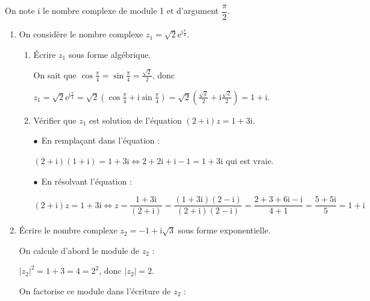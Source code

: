\documentclass{cornouaille}
\begin{document}

\Bareme

\begin{exercice}[][8]
On note i le nombre complexe de module 1 et d'argument $\dfrac{\pi}{2}$.
\medskip

\begin{enumerate}
\item On considère le nombre complexe $z_1 = \sqrt{2}\text{e}^{\text{i}\frac{\pi}{4}}$.
	\begin{enumerate}
		\item Écrire $z_1$ sous forme algébrique.
		
\ldotcarreaux[2]
\begin{solution}
On sait que $\cos \frac{\pi}{4} = \sin \frac{\pi}{4} = \frac{\sqrt{2}}{2}$, donc 
		
$z_1 = \sqrt{2}\text{e}^{\text{i}\frac{\pi}{4}} = \sqrt{2}\left(\cos \frac{\pi}{4} + \text{i} \sin \frac{\pi}{4}\right) = \sqrt{2}\left(\frac{\sqrt{2}}{2} + \text{i}\frac{\sqrt{2}}{2} \right) = 1 + \text{i}$.
\end{solution}
		\item Vérifier que $z_1$ est solution de l'équation $(2 + \text{i})z = 1 + 3\text{i}$.

\ldotcarreaux[3]
\begin{solution}
$\bullet~~$En remplaçant dans l'équation :
		
$(2 + \text{i})(1 + \text{i}) = 1 + 3\text{i} \iff 2 + 2\text{i} + \text{i} - 1 = 1 + 3\text{i}$ qui est vraie.
		
$\bullet~~$En résolvant l'équation :

$(2 + \text{i})z = 1 + 3\text{i} \iff z = \dfrac{1 + 3\text{i}}{(2 + \text{i})} = \dfrac{(1 + 3\text{i})(2 - \text{i})}{(2 + \text{i})(2 - \text{i})} = \dfrac{2 + 3 + 6\text{i} - \text{i}}{4 + 1} = \dfrac{5 + 5\text{i}}{5} = 1 + \text{i}$	
\end{solution}
 	\end{enumerate}
\item Écrire le nombre complexe $z_2 = - 1 + \text{i}\sqrt{3}$ sous forme exponentielle.

\ldotcarreaux[5]
\begin{solution}
On calcule d'abord le module de $z_2$ :

$\left|z_2\right|^2 = 1 + 3 = 4 = 2^2$, donc $\left|z_2\right| = 2$.

On factorise ce module dans l'écriture de $z_2$ :


\end{solution}
\end{enumerate}
\end{exercice}
\end{document}
